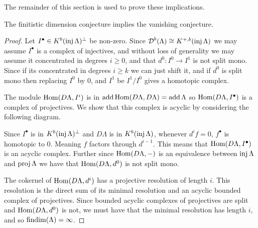The remainder of this section is used to prove these implications.

\begin{theorem} \cite[1.2]{Hap93} \label{thm:FDC_implies_VC}
	The finitistic dimension conjecture implies the vanishing conjecture.
	\begin{proof}
		Let $I^\bullet \in K^b(\operatorname{inj}\Lambda)^\perp$ be non-zero. Since $\operatorname{\mathcal{D}}^b(\Lambda) \cong K^{+,b}(\operatorname{inj}\Lambda)$ we may assume $I^\bullet$ is a complex of injectives, and without loss of generality we may assume it concentrated in degrees $i \geq 0$, and that $d^0\colon I^0 \to I^1$ is not split mono. Since if its concentrated in degrees $i \geq k$ we can just shift it, and if $d^0$ is split mono then replacing $I^0$ by $0$, and $I^1$ be $I^1/I^0$ gives a homotopic complex.
			
		The module $\operatorname{Hom}(D\Lambda, I^i)$ is in $\operatorname{add}\operatorname{Hom}(D\Lambda, D\Lambda) = \operatorname{add}\Lambda$ so $\operatorname{Hom}(D\Lambda, I^\bullet)$ is a complex of projectives. We show that this complex is acyclic by considering the following diagram.
		
		\begin{center}
		\end{center}
		
		Since $I^\bullet$ is in $K^b(\operatorname{inj}\Lambda)^\perp$ and $D\Lambda$ is in $K^b(\operatorname{inj}\Lambda)$, whenever $d^if=0$, $f^\bullet$ is homotopic to 0. Meaning $f$ factors through $d^{i-1}$. This means that $\operatorname{Hom}(D\Lambda, I^\bullet)$ is an acyclic complex. Further since $\operatorname{Hom}(D\Lambda, -)$ is an equivalence between $\operatorname{inj}\Lambda$ and $\operatorname{proj}\Lambda$ we have that $\operatorname{Hom}(D\Lambda, d^0)$ is not split mono.
		
		The cokernel of $\operatorname{Hom}(D\Lambda, d^i)$ has a projective resolution of length $i$. This resolution is the direct sum of its minimal resolution and an acyclic bounded complex of projectives. Since bounded acyclic complexes of projectives are split and $\operatorname{Hom}(D\Lambda, d^0)$ is not, we must have that the minimal resolution has length $i$, and so $\operatorname{findim}(\Lambda) = \infty$.
	\end{proof}
\end{theorem}

